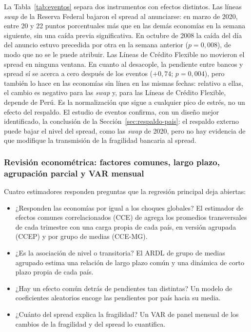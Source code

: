 La Tabla~\ref{tab:eventos} separa dos instrumentos con efectos distintos. Las líneas \textit{swap} de la Reserva Federal bajaron el spread al anunciarse: en marzo de 2020, entre 20 y 22 puntos porcentuales más que en las demás economías en la semana siguiente, sin una caída previa significativa. En octubre de 2008 la caída del día del anuncio estuvo precedida por otra en la semana anterior ($p=0{,}008$), de modo que no se le puede atribuir. Las Líneas de Crédito Flexible no movieron el spread en ninguna ventana. En cuanto al desacople, la pendiente entre bancos y spread sí se acerca a cero después de los eventos ($+0{,}74$; $p=0{,}004$), pero también lo hace en las economías sin línea en las mismas fechas: relativo a ellas, el cambio es negativo para las \textit{swap} y, para las Líneas de Crédito Flexible, depende de Perú. Es la normalización que sigue a cualquier pico de estrés, no un efecto del respaldo. El estudio de eventos confirma, con un diseño mejor identificado, la conclusión de la Sección~\ref{sec:respaldo-pais}: el respaldo externo puede bajar el nivel del spread, como las \textit{swap} de 2020, pero no hay evidencia de que modifique la transmisión de la fragilidad bancaria al spread.

\subsubsection{Revisión econométrica: factores comunes, largo plazo, agrupación parcial y VAR mensual}
\label{sec:revision-econometrica}

Cuatro estimadores responden preguntas que la regresión principal deja abiertas:
\begin{itemize}
    \item ¿Responden las economías por igual a los choques globales? El estimador de efectos comunes correlacionados (CCE) de \citet{Pesaran2006} agrega los promedios transversales de cada trimestre con una carga propia de cada país, en versión agrupada (CCEP) y por grupo de medias (CCE-MG).
    \item ¿Es la asociación de nivel o transitoria? El ARDL de grupo de medias agrupado \citep[PMG;][]{PesaranShinSmith1999} estima una relación de largo plazo común y una dinámica de corto plazo propia de cada país.
    \item ¿Hay un efecto común detrás de pendientes tan distintas? Un modelo de coeficientes aleatorios encoge las pendientes por país hacia su media.
    \item ¿Cuánto del spread explica la fragilidad? Un VAR de panel mensual de los cambios de la fragilidad y del spread lo cuantifica.
\end{itemize}

